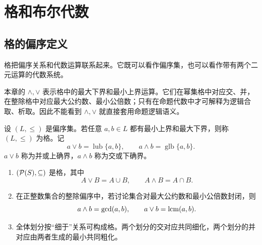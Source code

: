 %
%

\chapter{格和布尔代数}

\section{格的偏序定义}

格把偏序关系和代数运算联系起来。它既可以看作偏序集，也可以看作带有两个二元运算的代数系统。

\begin{pitfall}[格运算符号不是命题联结词]\label{lattice-symbol-pitfall}
  本章的 $\wedge,\vee$ 表示格中的最大下界和最小上界运算。它们在幂集格中对应交、并，在整除格中对应最大公约数、最小公倍数；只有在命题代数中才可解释为逻辑合取、析取。因此不能看到 $\wedge,\vee$ 就直接套用命题逻辑语义。
\end{pitfall}

\begin{definition}[格]\label{lattice-poset}
  设 $(L,\le)$ 是偏序集。若任意 $a,b\in L$ 都有最小上界和最大下界，则称 $(L,\le)$ 为格。记
  \[
  a\vee b=\operatorname{lub}\{a,b\},\qquad
  a\wedge b=\operatorname{glb}\{a,b\}.
  \]
  $a\vee b$ 称为并或上确界，$a\wedge b$ 称为交或下确界。
\end{definition}

\begin{example}[title={幂集格与整除格}]\label{lattice-examples}
  \begin{enumerate}
    \item $(\mathcal P(S),\subseteq)$ 是格，其中
    \[
    A\vee B=A\cup B,\qquad A\wedge B=A\cap B.
    \]
    \item 在正整数集合的整除偏序中，若讨论集合对最大公约数和最小公倍数封闭，则
    \[
    a\wedge b=\gcd(a,b),\qquad a\vee b=\operatorname{lcm}(a,b).
    \]
    \item 全体划分按“细于”关系可构成格。两个划分的交对应共同细化，两个划分的并对应由两者生成的最小共同粗化。
  \end{enumerate}
\end{example}

